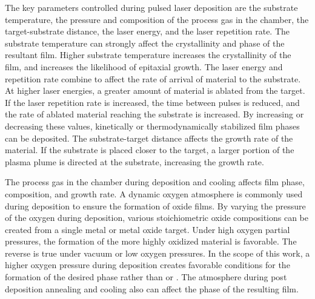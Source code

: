 The key parameters controlled during pulsed laser deposition are the substrate temperature, the pressure and composition of the process gas in the chamber, the target-substrate distance, the laser energy, and the laser repetition rate. The substrate temperature can strongly affect the crystallinity and phase of the resultant film. Higher substrate temperature increases the crystallinity of the film, and increases the likelihood of epitaxial growth.\cite{Francis:2004cf} The laser energy and repetition rate combine to affect the rate of arrival of material to the substrate. At higher laser energies, a greater amount of material is ablated from the target. If the laser repetition rate is increased, the time between pulses is reduced, and the rate of ablated material reaching the substrate is increased. By increasing or decreasing these values, kinetically or thermodynamically stabilized film phases can be deposited. The substrate-target distance affects the growth rate of the material. If the substrate is placed closer to the target, a larger portion of the plasma plume is directed at the substrate, increasing the growth rate. 

The process gas in the chamber during deposition and cooling affects film phase, composition, and growth rate. A dynamic oxygen atmosphere is commonly used during deposition to ensure the formation of oxide films. By varying the pressure of the oxygen during deposition, various stoichiometric oxide compositions can be created from a single metal or metal oxide target. Under high oxygen partial pressures, the formation of the more highly oxidized material is favorable. The reverse is true under vacuum or low oxygen pressures. In the scope of this work, a higher oxygen pressure during deposition creates favorable conditions for the formation of the desired  phase rather than  or . The atmosphere during post deposition annealing and cooling also can affect the phase of the resulting film.

